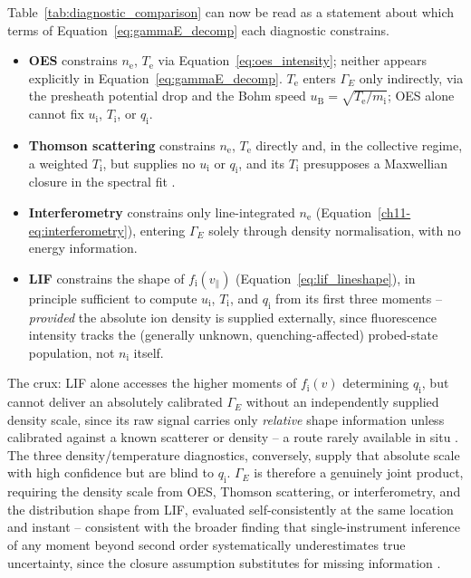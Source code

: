 Table~\ref{tab:diagnostic_comparison} can now be read as a statement about which terms of Equation~\eqref{eq:gammaE_decomp} each diagnostic constrains.

\begin{itemize}
\item \textbf{OES} constrains $n_{\mathrm{e}}$, $T_{\mathrm{e}}$ via Equation~\eqref{eq:oes_intensity}; neither appears explicitly in Equation~\eqref{eq:gammaE_decomp}. $T_{\mathrm{e}}$ enters $\Gamma_{E}$ only indirectly, via the presheath potential drop and the Bohm speed $u_{\mathrm{B}} = \sqrt{T_{\mathrm{e}}/m_{\mathrm{i}}}$; OES alone cannot fix $u_{\mathrm{i}}$, $T_{\mathrm{i}}$, or $q_{\mathrm{i}}$.
\item \textbf{Thomson scattering} constrains $n_{\mathrm{e}}$, $T_{\mathrm{e}}$ directly and, in the collective regime, a weighted $T_{\mathrm{i}}$, but supplies no $u_{\mathrm{i}}$ or $q_{\mathrm{i}}$, and its $T_{\mathrm{i}}$ presupposes a Maxwellian closure in the spectral fit \cite{ref0355}.
\item \textbf{Interferometry} constrains only line-integrated $n_{\mathrm{e}}$ (Equation~\eqref{ch11-eq:interferometry}), entering $\Gamma_{E}$ solely through density normalisation, with no energy information.
\item \textbf{LIF} constrains the shape of $f_{\mathrm{i}}(v_{\parallel})$ (Equation~\eqref{eq:lif_lineshape}), in principle sufficient to compute $u_{\mathrm{i}}$, $T_{\mathrm{i}}$, and $q_{\mathrm{i}}$ from its first three moments -- \emph{provided} the absolute ion density is supplied externally, since fluorescence intensity tracks the (generally unknown, quenching-affected) probed-state population, not $n_{\mathrm{i}}$ itself.
\end{itemize}

The crux: LIF alone accesses the higher moments of $f_{\mathrm{i}}(v)$ determining $q_{\mathrm{i}}$, but cannot deliver an absolutely calibrated $\Gamma_{E}$ without an independently supplied density scale, since its raw signal carries only \emph{relative} shape information unless calibrated against a known scatterer or density -- a route rarely available in situ \cite{ref0292}. The three density/temperature diagnostics, conversely, supply that absolute scale with high confidence but are blind to $q_{\mathrm{i}}$. $\Gamma_{E}$ is therefore a genuinely joint product, requiring the density scale from OES, Thomson scattering, or interferometry, and the distribution shape from LIF, evaluated self-consistently at the same location and instant -- consistent with the broader finding that single-instrument inference of any moment beyond second order systematically underestimates true uncertainty, since the closure assumption substitutes for missing information \cite{ref0711}.

